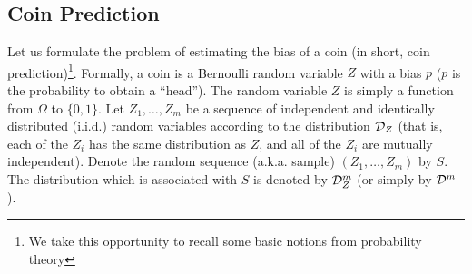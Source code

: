 \documentclass[11pt]{article}
\begin{document}
\subsection{Coin Prediction}  \label{sec:basicConcentration}
Let us formulate the problem of estimating the bias of a
coin (in short, coin prediction)\footnote{We take this opportunity to recall some basic notions from probability theory}. Formally, a coin is a Bernoulli random variable $Z$ with a bias $p$ ($p$ is the probability to obtain a ``head''). %
The random variable $Z$ is simply a function from $\Omega$ to
$\{0,1\}$. Let $Z_1,
\ldots, Z_m$ be a sequence of independent and identically distributed
(i.i.d.) random variables according to the distribution $\mathcal{D}_Z$ (that
is, each of the $Z_i$ has the same distribution as $Z$, and all of the
$Z_i$ are mutually independent). Denote the random sequence  (a.k.a. sample)
$(Z_1,\ldots, Z_m)$ by $S$. The distribution which is associated with $S$ is denoted by $\mathcal{D}_Z ^m$ (or simply by $\mathcal{D}^m$).
\end{document}
